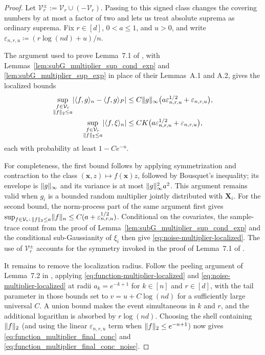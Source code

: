 \documentclass[11pt]{article}
\theoremstyle{plain}
\theoremstyle{definition}
\theoremstyle{remark}
\theoremstyle{plain}
\newcommand{\bx}{\mathbf{x}}
\newcommand{\bX}{\mathbf{X}}
\DeclarePairedDelimiter{\abs}{|}{|}
\DeclarePairedDelimiter{\norm}{\|}{\|}
\DeclarePairedDelimiter{\inprod}{\langle}{\rangle}
\newcommand{\partfunc}{\mathcal{V}}
\newcommand{\1}{\mathbbm{1}}
\begin{document}
\begin{proof}
Let $\partfunc_r^\pm:=\partfunc_r\cup(-\partfunc_r)$. Passing to this
signed class changes the covering numbers by at most a factor of two
and lets us treat absolute suprema as ordinary suprema. Fix $r\in[d]$,
$0<a\leq 1$, and $u>0$, and write $\varepsilon_{n,r,u}\coloneqq (r\log(nd)+u)/n$.

The argument used to prove Lemma~7.1 of \citet{xu2026statistical}, with
Lemmas~\ref{lem:subG_multiplier_sup_cond_exp} and
\ref{lem:subG_multiplier_sup_exp} in place of their Lemmas~A.1 and A.2,
gives the localized bounds
\begin{align}
\sup_{\substack{f\in\partfunc_r\\ \norm{f}_2\leq a}}
\abs*{\inprod{f,g}_n-\inprod{f,g}_P}
&\leq C\norm{g}_\infty\bigl(a\varepsilon_{n,r,u}^{1/2}+\varepsilon_{n,r,u}\bigr),
\label{eq:function-multiplier-localized}\\
\sup_{\substack{f\in\partfunc_r\\ \norm{f}_2\leq a}}
\abs*{\inprod{f,\xi}_n}
&\leq CK\bigl(a\varepsilon_{n,r,u}^{1/2}+\varepsilon_{n,r,u}\bigr),
\label{eq:noise-multiplier-localized}
\end{align}
each with probability at least $1-Ce^{-u}$.

For completeness, the first bound follows by applying symmetrization
and contraction to the class $(\bx,z)\mapsto f(\bx)z$, followed by
Bousquet's inequality; its envelope is $\norm{g}_\infty$ and its
variance is at most $\norm{g}_\infty^2a^2$. This argument remains valid
when $g_i$ is a bounded random multiplier jointly distributed with
$\bX_i$. For the second bound, the norm-process part of the same
argument first gives
$\sup_{f\in\partfunc_r:\,\norm{f}_2\leq a}\norm{f}_n
\leq C(a+\varepsilon_{n,r,u}^{1/2})$.
Conditional on the covariates, the sample-trace count from the proof of
Lemma~\ref{lem:subG_multiplier_sup_cond_exp} and the conditional
sub-Gaussianity of $\xi_i$ then give
\eqref{eq:noise-multiplier-localized}. The use of
$\partfunc_r^\pm$ accounts for the symmetry invoked in the proof of
Lemma~7.1 of \citet{xu2026statistical}.

It remains to remove the localization radius. Follow the peeling
argument of Lemma~7.2 in \citet{xu2026statistical}, applying
\eqref{eq:function-multiplier-localized} and
\eqref{eq:noise-multiplier-localized} at radii $a_k=e^{-k+1}$ for
$k\in[n]$ and $r\in[d]$, with the tail parameter in those bounds set to
$v=u+C\log(nd)$ for a sufficiently large universal $C$. A union bound makes the event simultaneous in $k$ and
$r$, and the additional logarithm is absorbed by $r\log(nd)$. Choosing
the shell containing $\norm{f}_2$ (and using the linear $\varepsilon_{n,r,u}$ term
when $\norm{f}_2\leq e^{-n+1}$) now gives
\eqref{eq:function_multiplier_final_conc} and
\eqref{eq:function_multiplier_final_conc_noise}.
\end{proof}
\end{document}
